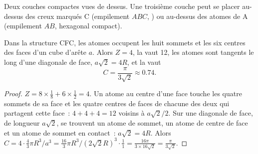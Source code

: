 \begin{omfigure}

{\small Deux couches compactes vues de dessus. Une troisième couche peut
se placer au-dessus des creux marqués C (empilement $ABC$, ) ou au-dessus des atomes de A (empilement $AB$,
hexagonal compact).}
\end{omfigure}

\begin{proposition}\label{prop:b1:crystals-metals:fcc}
Dans la structure CFC, les atomes occupent les huit sommets et les six
centres des faces d'un cube d'arête $a$. Alors $Z = 4$, la 
vaut 12, les atomes sont tangents le long d'une diagonale de face,
$a\sqrt2 = 4R$, et la  vaut
\[
  C = \frac{\pi}{3\sqrt2} \approx 0.74 .
\]
\end{proposition}

\begin{proof}
$Z = 8 \times \frac18 + 6 \times \frac12 = 4$. Un atome au centre d'une
face touche les quatre sommets de sa face et les quatre centres de faces
de chacune des deux  qui partagent cette face~: $4 + 4 + 4 = 12$
voisins à $a\sqrt2/2$. Sur une diagonale de face, de longueur $a\sqrt2$,
se trouvent un atome de sommet, un atome de centre de face et un atome
de sommet en contact~: $a\sqrt2 = 4R$. Alors
$C = 4 \cdot \frac43\pi R^3/a^3 = \frac{16}{3}\pi R^3/(2\sqrt2 R)^3 \cdot
\frac{1}{1} = \frac{16\pi}{3 \times 16\sqrt2} = \frac{\pi}{3\sqrt2}$.
\end{proof}

